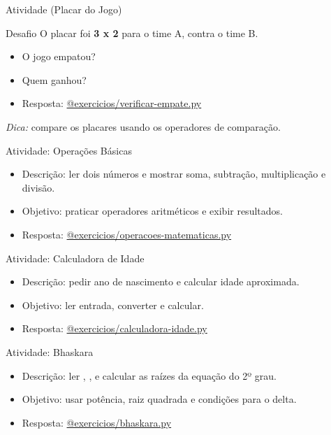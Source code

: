 \documentclass[aspectratio=169]{beamer}
\let\texttt\textttblue
\begin{document}
\begin{frame}{Atividade (Placar do Jogo)}
  \begin{block}{Desafio}
    O placar foi \textbf{3 x 2} para o time A, contra o time B.
  \end{block}
  \begin{itemize}
    \item O jogo empatou?
    \item Quem ganhou?
    \item Resposta: \href{https://github.com/claudioscheer/exercicios-iniciantes-python/blob/master/exercicios/verificar-empate.py}{@exercicios/verificar-empate.py}
  \end{itemize}
  \vspace{0.5em}
  \textit{Dica:} compare os placares usando os operadores de comparação.
\end{frame}

\begin{frame}{Atividade: Operações Básicas}
  \begin{itemize}
    \item Descrição: ler dois números e mostrar soma, subtração, multiplicação e divisão.
    \item Objetivo: praticar operadores aritméticos e exibir resultados.
    \item Resposta: \href{https://github.com/claudioscheer/exercicios-iniciantes-python/blob/master/exercicios/operacoes-matematicas.py}{@exercicios/operacoes-matematicas.py}
  \end{itemize}
\end{frame}

\begin{frame}{Atividade: Calculadora de Idade}
  \begin{itemize}
    \item Descrição: pedir ano de nascimento e calcular idade aproximada.
    \item Objetivo: ler entrada, converter e calcular.
    \item Resposta: \href{https://github.com/claudioscheer/exercicios-iniciantes-python/blob/master/exercicios/calculadora-idade.py}{@exercicios/calculadora-idade.py}
  \end{itemize}
\end{frame}

\begin{frame}{Atividade: Bhaskara}
  \begin{itemize}
    \item Descrição: ler \texttt{a}, \texttt{b}, \texttt{c} e calcular as raízes da equação do 2º grau.
    \item Objetivo: usar potência, raiz quadrada e condições para o delta.
    \item Resposta: \href{https://github.com/claudioscheer/exercicios-iniciantes-python/blob/master/exercicios/bhaskara.py}{@exercicios/bhaskara.py}
  \end{itemize}
\end{frame}
\end{document}
